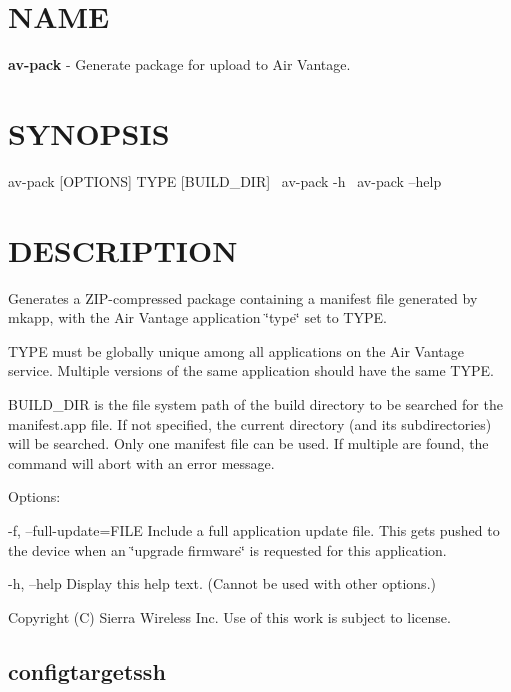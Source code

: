 \section*{N\+A\+M\+E}

{\bfseries av-\/pack} -\/ Generate package for upload to Air Vantage.

\section*{S\+Y\+N\+O\+P\+S\+I\+S}

{\ttfamily av-\/pack \mbox{[}O\+P\+T\+I\+O\+N\+S\mbox{]} T\+Y\+P\+E \mbox{[}B\+U\+I\+L\+D\+\_\+\+D\+I\+R\mbox{]}}~\newline
 {\ttfamily av-\/pack -\/h}~\newline
 {\ttfamily av-\/pack --help}~\newline


\section*{D\+E\+S\+C\+R\+I\+P\+T\+I\+O\+N}

Generates a Z\+I\+P-\/compressed package containing a manifest file generated by mkapp, with the Air Vantage application \char`\"{}type\char`\"{} set to T\+Y\+P\+E.

T\+Y\+P\+E must be globally unique among all applications on the Air Vantage service. Multiple versions of the same application should have the same T\+Y\+P\+E.

B\+U\+I\+L\+D\+\_\+\+D\+I\+R is the file system path of the build directory to be searched for the manifest.\+app file. If not specified, the current directory (and its subdirectories) will be searched. Only one manifest file can be used. If multiple are found, the command will abort with an error message.

Options\+:

-\/f, --full-\/update=F\+I\+L\+E Include a full application update file. This gets pushed to the device when an \char`\"{}upgrade firmware\char`\"{} is requested for this application.

-\/h, --help Display this help text. (Cannot be used with other options.)



 Copyright (C) Sierra Wireless Inc. Use of this work is subject to license. \hypertarget{toolsHost_configtargetssh}{}\subsection{configtargetssh}\label{toolsHost_configtargetssh}
